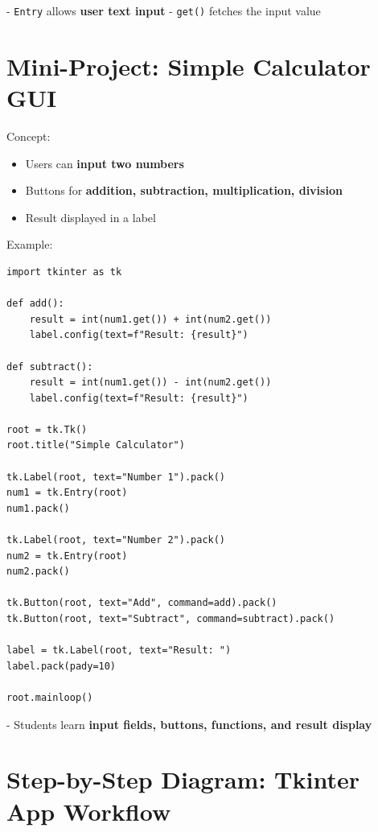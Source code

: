 - \texttt{Entry} allows \textbf{user text input}  
- \texttt{get()} fetches the input value  

\section{Mini-Project: Simple Calculator GUI}

Concept:

\begin{itemize}
    \item Users can \textbf{input two numbers}  
    \item Buttons for \textbf{addition, subtraction, multiplication, division}  
    \item Result displayed in a label  
\end{itemize}

Example:

\begin{verbatim}
import tkinter as tk

def add():
    result = int(num1.get()) + int(num2.get())
    label.config(text=f"Result: {result}")

def subtract():
    result = int(num1.get()) - int(num2.get())
    label.config(text=f"Result: {result}")

root = tk.Tk()
root.title("Simple Calculator")

tk.Label(root, text="Number 1").pack()
num1 = tk.Entry(root)
num1.pack()

tk.Label(root, text="Number 2").pack()
num2 = tk.Entry(root)
num2.pack()

tk.Button(root, text="Add", command=add).pack()
tk.Button(root, text="Subtract", command=subtract).pack()

label = tk.Label(root, text="Result: ")
label.pack(pady=10)

root.mainloop()
\end{verbatim}

- Students learn \textbf{input fields, buttons, functions, and result display}  

\section{Step-by-Step Diagram: Tkinter App Workflow}

